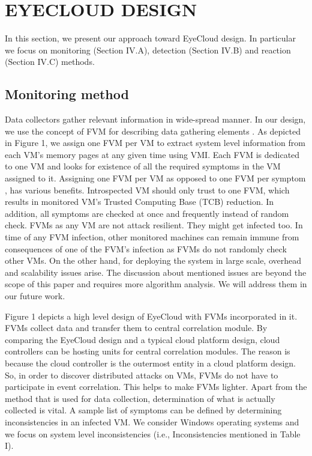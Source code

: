 \documentclass[conference]{IEEEtran}
\begin{document}
\section{EYECLOUD DESIGN}
In this section, we present our approach toward EyeCloud design. In particular we focus on monitoring (Section IV.A), detection (Section IV.B) and reaction (Section IV.C) methods.  
\subsection{Monitoring method}
Data collectors gather relevant information in wide-spread manner. In our design, we use the concept of FVM for describing data gathering elements \cite{ref7}. As depicted in Figure 1, we assign one FVM per VM to extract system level information from each VM's memory pages at any given time using VMI. Each FVM is dedicated to one VM and looks for existence of all the required symptoms in the VM assigned to it. Assigning one FVM per VM as opposed to one FVM per symptom \cite{ref7}, has various benefits. Introspected VM should only trust to one FVM, which results in monitored VM's Trusted Computing Base (TCB) reduction. In addition, all symptoms are checked at once and frequently instead of random check. FVMs as any VM are not attack resilient. They might get infected too. In time of any FVM infection, other monitored machines can remain immune from consequences of one of the FVM's infection as FVMs do not randomly check other VMs. On the other hand, for deploying the system in large scale, overhead and scalability issues arise. The discussion about mentioned issues are beyond the scope of this paper and requires more algorithm analysis. We will address them in our future work.    

Figure 1 depicts a high level design of EyeCloud with FVMs incorporated in it. FVMs collect data and transfer them to central correlation module. By comparing the EyeCloud design and a typical cloud platform design, cloud controllers can be hosting units for central correlation modules. The reason is because the cloud controller is the outermost entity in a cloud platform design. So, in order to discover distributed attacks on VMs, FVMs do not have to participate in event correlation. This helps to make FVMs lighter. Apart from the method that is used for data collection, determination of what is actually collected is vital. A sample list of symptoms can be defined by determining inconsistencies in an infected VM. We consider Windows operating systems and we focus on system level inconsistencies (i.e., Inconsistencies mentioned in Table I). 
\end{document}
